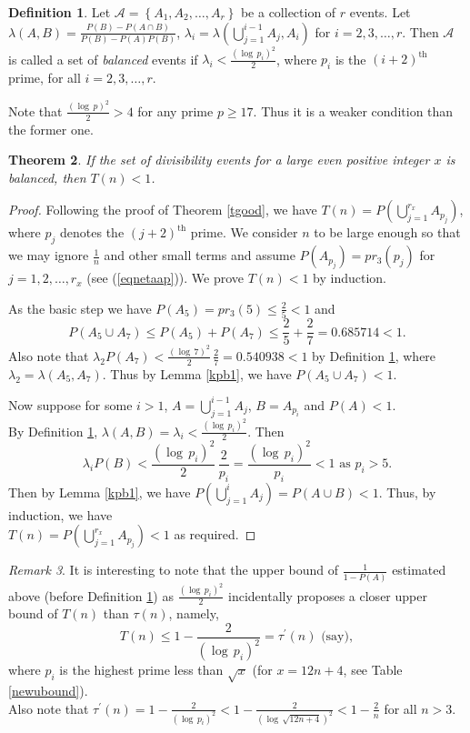 \documentclass[11pt]{article}
\newtheorem{theorem}{Theorem}[section]
\theoremstyle{definition}
\newtheorem{definition}[theorem]{Definition}
\theoremstyle{remark}
\newtheorem{remark}[theorem]{Remark}
\numberwithin{equation}{section}
\newcommand{\set}[1]{\left\{#1\right\}}
\begin{document}
\begin{definition}\label{defblncd}
Let $\mathscr{A}=\set{A_1,A_2,\ldots,A_r}$ be a collection of $r$ events. Let $\lambda (A,B)=\frac{P(B)-P(A\cap B)}{P(B)-P(A)P(B)}$, $\lambda_i=\lambda (\bigcup\limits_{j=1}^{i-1} A_j,A_i)$ for $i=2,3,\ldots,r$. Then $\mathscr{A}$ is called a set of {\em balanced} events if $\lambda_i<\frac{(\log\, p_i)^2}{2}$, where $p_i$ is the $(i+2)^{\text{th}}$ prime, for all $i=2,3,\ldots,r$.
\end{definition}

\noindent
Note that $\frac{(\log\, p)^2}{2}>4$ for any prime $p\geq 17$. Thus it is a weaker condition than the former one.

\begin{theorem}\label{thmblncd}
If the set of divisibility events for a large even positive integer $x$ is balanced, then $T(n)<1$. 
\end{theorem}

\begin{proof}
Following the proof of Theorem \ref{tgood}, we have $T(n)=P(\bigcup\limits_{j=1}^{r_x} A_{p_j})$, where $p_j$ denotes the $(j+2)^{\text{th}}$ prime. We consider $n$ to be large enough so that we may ignore $\frac{1}{n}$ and other small terms and assume $P(A_{p_j})=pr_3(p_j)$ for $j=1,2,\ldots, r_x$ (see (\ref{eqnetaap})). We prove $T(n)<1$ by induction.

\vspace{1em}
\noindent
As the basic step we have $P(A_5)=pr_3(5)\leq \frac{2}{5}<1$ and 
$$P(A_5\cup A_7)\leq P(A_5)+P(A_7)\leq \frac{2}{5}+\frac{2}{7}=0.685714<1.$$
Also note that $\lambda_2 P(A_7)<\frac{(\log\, 7)^2}{2}\,\frac{2}{7}=0.540938<1$ by Definition \ref{defblncd}, where $\lambda_2=\lambda(A_5,A_7)$. Thus by Lemma \ref{kpb1}, we have $P(A_5\cup A_7)<1$.

\vspace{1em}
\noindent
Now suppose for some $i>1$, $A=\bigcup\limits_{j=1}^{i-1} A_j$, $B=A_{p_i}$ and $P(A)<1$.\\[1em]
By Definition \ref{defblncd}, $\lambda(A,B)=\lambda_i<\frac{(\log\, p_i)^2}{2}$. 
Then 
$$\lambda_i P(B)< \frac{(\log\, p_i)^2}{2}\,\frac{2}{p_i}=\frac{(\log\, p_i)^2}{p_i}<1 \text{ as } p_i>5.$$
Then by Lemma \ref{kpb1}, we have $P(\bigcup\limits_{j=1}^{i} A_j)=P(A\cup B)<1$. Thus, by induction, we have\\
 $T(n)=P(\bigcup\limits_{j=1}^{r_x} A_{p_j})<1$ as required.
\end{proof}

\begin{remark}
It is interesting to note that the upper bound of $\frac{1}{1-P(A)}$ estimated above (before Definition \ref{defblncd}) as $\frac{(\log\, p_i)^2}{2}$ incidentally proposes a closer upper bound of $T(n)$ than $\tau(n)$, namely, 
$$T(n)\leq 1-\frac{2}{(\log\, p_i)^2}=\tau^\prime (n) \text{ (say)},$$
where $p_i$ is the highest prime less than $\sqrt{x}$ (for $x=12n+4$, see Table \ref{newubound}).\\
 Also note that $\tau^\prime (n)=1-\frac{2}{(\log\, p_i)^2}<1-\frac{2}{(\log\, \sqrt{12n+4})^2}<1-\frac{2}{n}$ for all $n>3$.
\end{remark}
\end{document}
